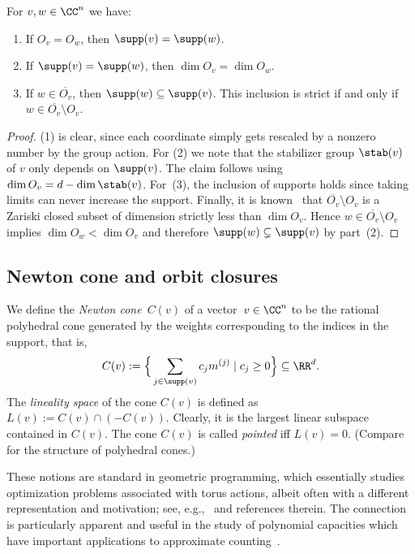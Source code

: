 \begin{lemma} \label{lem:supp-dim}
For $v,w \in \CC^n$ we have:
\begin{enumerate}
\item If $O_v = O_w$, then $\supp(v) = \supp(w)$.
\item If $\supp(v) = \supp(w)$, then $\dim O_v = \dim O_w$.
\item\label{it:supp down cl} If $w \in \overline{O_v}$, then $\supp(w) \subseteq \supp(v)$.
This inclusion is strict if and only if $w \in \overline{O_v} \setminus O_v$.
\end{enumerate}
\end{lemma}
\begin{proof}
(1) is clear, since each coordinate simply gets rescaled by a nonzero number by the group action.
For (2) we note that the stabilizer group $\stab(v)$ of $v$ only depends on $\supp(v)$.
The claim follows using $\dim O_v = d - \dim \stab(v)$.
For~(3), the inclusion of supports holds since taking limits can never increase the support.
Finally, it is known~\cite[\S8.3]{Humphreys:75} that $\overline{O_v} \setminus O_v$ is a Zariski closed subset of dimension
strictly less than $\dim O_v$. Hence $w \in \overline{O_v} \setminus O_v$ implies $\dim O_w < \dim O_v$
and therefore $\supp(w) \subsetneq \supp(v)$ by part~(2).
\end{proof}

%
\subsection{Newton cone and orbit closures}
%
We define the \emph{Newton cone}~$C(v)$ of a vector~$v\in \CC^n$ to be the rational polyhedral cone generated by
the weights corresponding to the indices in the support, that is,
\[
 C(v) := \Big\{\sum_{j\in\supp(v)} c_j m^{(j)} \mid c_j \ge 0 \Big\}\subseteq\RR^d .
\]
The {\em lineality space} of the cone $C(v)$ is defined as
$L(v) := C(v) \cap (-C(v))$. Clearly, it is the largest linear subspace contained in $C(v)$.
The cone $C(v)$ is called {\em pointed} iff $L(v)=0$.
(Compare~\cite{schrijver:86} for the structure of polyhedral cones.)

These notions are standard in geometric programming, which essentially studies optimization problems associated with torus actions, albeit often with a different representation and motivation; see, e.g.,~\cite{BLNW:20} and references therein.
The connection is particularly apparent and useful in the study of polynomial capacities which have important applications to approximate counting~\cite{linial2000deterministic,gurvits2004combinatorial}.

